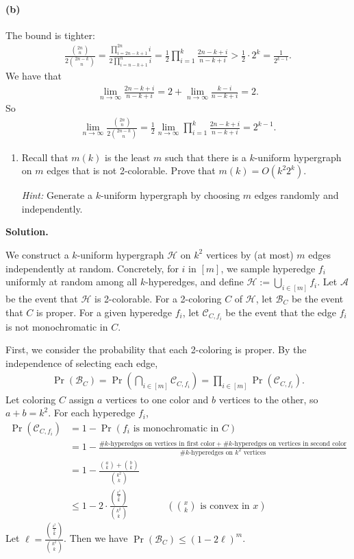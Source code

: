 \documentclass[11pt,letterpaper]{article}
\theoremstyle{definition}
\newcommand{\calA}{\mathcal{A}}
\newcommand{\calB}{\mathcal{B}}
\newcommand{\calC}{\mathcal{C}}
\newcommand{\calH}{\mathcal{H}}
\newcommand{\solution}{\medskip\noindent\textbf{Solution.}\par\medskip}
\begin{document}
\paragraph{(b)}
The bound is tighter:
\begin{align*}
    \frac{\binom{2n}{n}}{2\binom{2n-k}{n}} = \frac{\prod_{i=2n-k+1}^{2n}i}{2\prod_{i=n-k+1}^{n}i} = \frac{1}{2}\prod_{i=1}^{k}\frac{2n-k+i}{n-k+i}>\frac{1}{2}\cdot 2^k = \frac{1}{2^{k-1}}.
\end{align*}
We have that 
\begin{align*}
    \lim_{n\to \infty}\frac{2n-k+i}{n-k+i} = 2 + \lim_{n\to\infty}\frac{k-i}{n-k+i} = 2.
\end{align*}
So 
\begin{align*}
    \lim_{n\to\infty}\frac{\binom{2n}{n}}{2\binom{2n-k}{n}} = \frac{1}{2}\lim_{n\to\infty} \prod_{i=1}^{k}\frac{2n-k+i}{n-k+i} = 2^{k-1}.
\end{align*}

\begin{enumerate}[resume]
\item Recall that $m(k)$ is the least $m$ such that there is a $k$-uniform hypergraph on $m$ edges that is not 2-colorable. Prove that $m(k) = O(k^2 2^k)$.

\emph{Hint:} Generate a $k$-uniform hypergraph by choosing $m$ edges randomly and independently.
\end{enumerate}

\solution

We construct a $k$-uniform hypergraph $\calH$ on $k^2$ vertices by (at most) $m$ edges independently at random.
Concretely, for $i$ in $[m]$, we sample hyperedge $f_i$ uniformly at random among all $k$-hyperedges, and define $\calH := \bigcup_{i\in[m]}f_i$.
Let $\calA$ be the event that $\calH$ is 2-colorable. 
For a 2-coloring $C$ of $\calH$, let $\calB_C$ be the event that $C$ is proper.
For a given hyperedge $f_i$, let $\calC_{C,f_i}$ be the event that the edge $f_i$ is not monochromatic in $C$.

First, we consider the probability that each 2-coloring is proper. By the independence of selecting each edge, 
    \begin{align*}
        \Pr(\calB_C) = \Pr\left(\bigcap_{i\in [m]}\calC_{C,f_i}\right) = \prod_{i\in [m]}\Pr\left(\calC_{C,f_i}\right).
    \end{align*}
    Let coloring $C$ assign $a$ vertices to one color and $b$ vertices to the other, so $a+b = k^2$. 
    For each hyperedge $f_i$,
    \begin{align*}
        \Pr(\calC_{C,f_i}) &= 1 - \Pr(f_i\text{ is monochromatic in }C) \\
        & = 1- \frac{\# k\text{-hyperedges on vertices in first color} + \# k\text{-hyperedges on vertices in second color}}{\# k\text{-hyperedges on }k^2\text{ vertices}} \\
        & = 1- \frac{\binom{a}{k} + \binom{b}{k}}{\binom{k^2}{k}} \\
        & \leq 1 - 2\cdot \frac{\binom{\frac{k^2}{2}}{k}}{\binom{k^2}{k}} \qquad \qquad(\binom{x}{k}\text{ is convex in }x)
    \end{align*}
Let $\ell = \frac{\binom{\frac{k^2}{2}}{k}}{\binom{k^2}{k}}$. Then we have $\Pr(\calB_C) \leq (1-2\ell)^m$.
\end{document}
